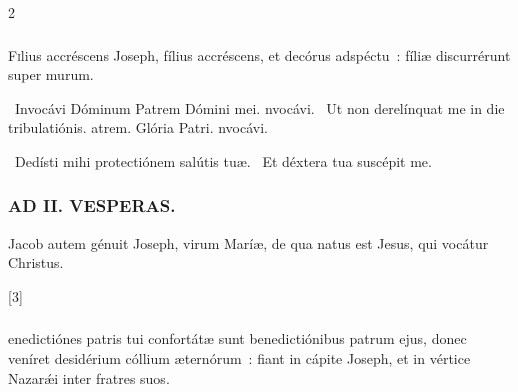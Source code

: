 \documentclass[9pt,twoside]{extarticle}
\begin{document}
\begin{multicols}{2}
{\subsubsection*{}
\lettrine{F}ilius accréscens Joseph, fílius accréscens, et decórus adspéctu~: fíliæ discurrérunt super murum.

\begin{tightlist}{}
\item {}~Invocávi Dóminum \textred{*} Patrem Dómini mei. nvocávi. ~Ut non derelínquat me in die tribulatiónis. atrem. Glória Patri. nvocávi.
\item {}~Dedísti mihi protectiónem salútis tuæ. ~Et déxtera tua suscépit me.
\end{tightlist}

\subsubsection*{\center \textsc{AD II. VESPERAS.}}
\begin{tightlist}{}
\item {} Jacob autem génuit Joseph, virum Maríæ, de qua natus est Jesus, qui vocátur Christus. 
\item {} [3]
\end{tightlist}

\subsubsection*{}
enedictiónes patris tui confortátæ sunt benedictiónibus patrum ejus, donec veníret desidérium cóllium æternórum~: fiant in cápite Joseph, et in vértice Nazarǽi inter fratres suos.

}
\end{multicols}
\end{document}
